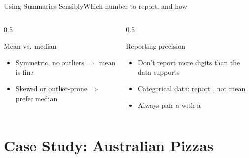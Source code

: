 \documentclass[aspectratio=169,11pt]{beamer}
\begin{document}
\begin{frame}{Using Summaries Sensibly}{Which number to report, and how}
  \begin{columns}[T]
    \begin{column}{0.5\textwidth}
      \begin{block}{Mean vs.\ median}
        \small
        \begin{itemize}
          \item Symmetric, no outliers $\Rightarrow$ mean is fine
          \item Skewed or outlier-prone $\Rightarrow$ prefer median
        \end{itemize}
      \end{block}
    \end{column}
    \begin{column}{0.5\textwidth}
      \begin{exampleblock}{Reporting precision}
        \small
        \begin{itemize}
          \item Don't report more digits than the data supports
          \item Categorical data: report , not mean
          \item Always pair a  with a 
        \end{itemize}
      \end{exampleblock}
    \end{column}
  \end{columns}
\end{frame}

\section{Case Study: Australian Pizzas}
\end{document}
